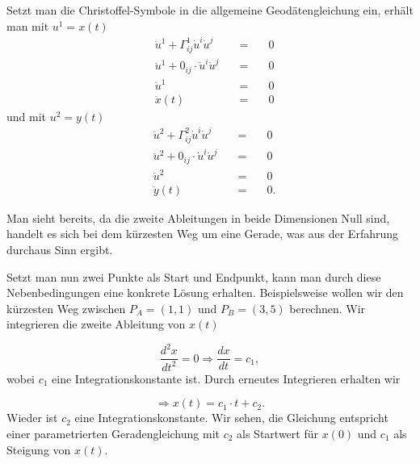 Setzt man die Christoffel-Symbole in die allgemeine Geodätengleichung ein, erhält man mit $u^1 = x(t)$
\begin{equation}
	\begin{alignedat}{2}
		&\ddot{u}^1 + \Gamma_{ij}^1 \dot{u}^i \dot{u}^j &=& \quad 0 \\
		&\ddot{u}^1 + 0_{ij} \cdot \dot{u}^i \dot{u}^j \quad &=& \quad 0\\
		&\ddot{u}^1  &=& \quad 0 \\
		&\ddot{x}(t) &=& \quad 0
	\end{alignedat}
	\label{geodaeten:equation:Standardverfahren:Kartesisch:x}
\end{equation}
und mit $u^2 = y(t)$
\begin{equation}
	\begin{alignedat}{2}
		&\ddot{u}^2 + \Gamma_{ij}^2 \dot{u}^i \dot{u}^j &=& \quad 0 \\
		&\ddot{u}^2 + 0_{ij} \cdot \dot{u}^i \dot{u}^j \quad &=& \quad 0 \\
		&\ddot{u}^2  &=& \quad 0 \\
		&\ddot{y}(t) &=& \quad 0  .
	\end{alignedat}
	\label{geodaeten:equation:Standardverfahren:Kartesisch:y}
\end{equation}


Man sieht bereits, da die zweite Ableitungen in beide Dimensionen Null sind, handelt es sich bei dem kürzesten Weg um eine Gerade, was aus der Erfahrung durchaus Sinn ergibt.

Setzt man nun zwei Punkte als Start und Endpunkt, kann man durch diese Nebenbedingungen eine konkrete Lösung erhalten.
Beispielsweise wollen wir den kürzesten Weg zwischen $P_A = (1,1)$ und $P_B = (3,5)$ berechnen. Wir integrieren die zweite Ableitung von $x(t)$

\begin{equation}
	\frac{d^2x}{dt^2} = 0 \Rightarrow \frac{dx}{dt} = c_1 ,
\end{equation}
wobei $c_1$ eine Integrationskonstante ist. Durch erneutes Integrieren erhalten wir

\begin{equation}
\Rightarrow x(t) = c_1 \cdot t + c_2  .
\label{geodaeten:equation:Standardverfahren:Kartesisch:equation1}
\end{equation}
Wieder ist $c_2$ eine Integrationskonstante. 
Wir sehen, die Gleichung entspricht einer parametrierten Geradengleichung mit $c_2$ als Startwert für $x(0)$ und $c_1$ als Steigung von $x(t)$. 


